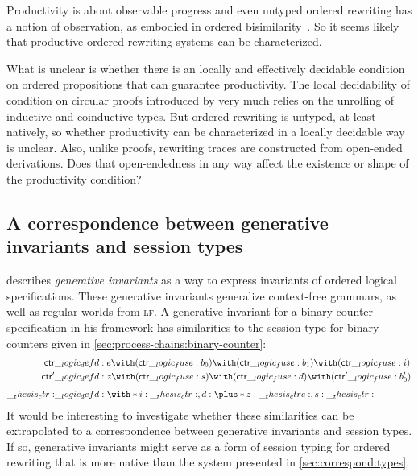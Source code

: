 Productivity is about observable progress and even untyped ordered rewriting has a notion of observation, as embodied in ordered bisimilarity~.
So it seems likely that productive ordered rewriting systems can be characterized.

What is unclear is whether there is an locally and effectively decidable condition on ordered propositions that can guarantee productivity.
The local decidability of condition on circular proofs introduced by \citeauthor{Derakhshan+Pfenning:LMCS20}
very much relies on the unrolling of inductive and coinductive types.
But ordered rewriting is untyped, at least natively, so whether productivity can be characterized in a locally decidable way is unclear.
Also, unlike proofs, rewriting traces are constructed from open-ended derivations.
Does that open-endedness in any way affect the existence or shape of the productivity condition?

\subsection{A correspondence between generative invariants and session types}

 describes \emph{generative invariants} as a way to express invariants of ordered logical specifications.
These generative invariants generalize context-free grammars, as well as regular worlds from \textsc{lf}.
A generative invariant for a binary counter specification in his framework has similarities to the session type for binary counters given in \cref{sec:process-chains:binary-counter}:
\begin{align*}
  \mathsf{ctr} &\defd e \with (\mathsf{ctr} \fuse b_0) \with (\mathsf{ctr} \fuse b_1) \with (\mathsf{ctr} \fuse i) \\
  \mathsf{ctr}' &\defd z \with (\mathsf{ctr} \fuse s) \with (\mathsf{ctr} \fuse d) \with (\mathsf{ctr}' \fuse b'_0) \\[1ex]
  \ctr &\defd \with*{ i: \ctr , d: \plus*{ z: \ctre , s: \ctr } }
\end{align*}
It would be interesting to investigate whether these similarities can be extrapolated to a correspondence between generative invariants and session types.
If so, generative invariants might serve as a form of session typing for ordered rewriting that is more native than the system presented in \cref{sec:correspond:types}.

